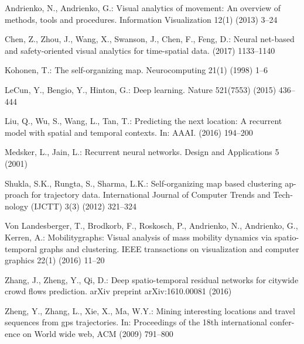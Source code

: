 \documentclass[runningheads,a4paper]{llncs}
\begin{document}
\begin{thebibliography}{99}
 Andrienko, N., Andrienko, G.: Visual analytics of movement: An overview of
methods, tools and procedures. Information Visualization 12(1) (2013) 3–24

Chen, Z., Zhou, J., Wang, X., Swanson, J., Chen, F., Feng, D.: Neural net-based
and safety-oriented visual analytics for time-spatial data. (2017) 1133–1140

Kohonen, T.: The self-organizing map. Neurocomputing 21(1) (1998) 1–6

LeCun, Y., Bengio, Y., Hinton, G.: Deep learning. Nature 521(7553) (2015) 436–
444

Liu, Q., Wu, S., Wang, L., Tan, T.: Predicting the next location: A recurrent model
with spatial and temporal contexts. In: AAAI. (2016) 194–200

Medsker, L., Jain, L.: Recurrent neural networks. Design and Applications 5
(2001)

Shukla, S.K., Rungta, S., Sharma, L.K.: Self-organizing map based clustering ap-
proach for trajectory data. International Journal of Computer Trends and Tech-
nology (IJCTT) 3(3) (2012) 321–324

Von Landesberger, T., Brodkorb, F., Roskosch, P., Andrienko, N., Andrienko, G.,
Kerren, A.: Mobilitygraphs: Visual analysis of mass mobility dynamics via spatio-
temporal graphs and clustering. IEEE transactions on visualization and computer
graphics 22(1) (2016) 11–20

 Zhang, J., Zheng, Y., Qi, D.: Deep spatio-temporal residual networks for citywide
crowd flows prediction. arXiv preprint arXiv:1610.00081 (2016)

 Zheng, Y., Zhang, L., Xie, X., Ma, W.Y.: Mining interesting locations and travel
sequences from gps trajectories. In: Proceedings of the 18th international confer-
ence on World wide web, ACM (2009) 791–800

\end{thebibliography}
\end{document}
